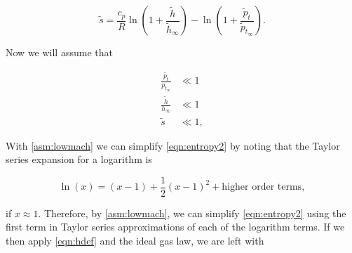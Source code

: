 \begin{equation}
    \label{eqn:entropy2}
    \widetilde{s} = \frac{c_p}{R} \ln\left(1+\frac{\widetilde{h}}{\widetilde{h}_\infty}\right) - \ln\left(1+\frac{\widetilde{p}_t}{\widetilde{p}_{t_\infty}}\right).
\end{equation}



Now we will assume that

\begin{assumption}
    \label{asm:lowmach}


    \begin{align}
        \frac{\widetilde{p_t}}{p_{t_\infty}}  &\ll  1 \\
        \frac{\widetilde{h}}{h_\infty} &\ll  1 \\
        \widetilde{s} &\ll  1,
    \end{align}



\end{assumption}

\noindent With \cref{asm:lowmach} we can simplify \cref{eqn:entropy2} by noting that the Taylor series expansion for a logarithm is

\begin{equation}
    \ln(x) = (x-1) + \frac{1}{2}(x-1)^2 + \text{higher order terms},
\end{equation}

\noindent if \(x\approx1\).
%
Therefore, by \cref{asm:lowmach}, we can simplify \cref{eqn:entropy2} using the first term in Taylor series approximations of each of the logarithm terms.
%
If we then apply \cref{eqn:hdef} and the ideal gas law, we are left with

